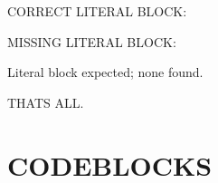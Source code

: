 \documentclass[letterpaper,10pt,english]{sphinxmanual}
\begin{document}
\sphinxAtStartPar
CORRECT LITERAL BLOCK:

\begin{sphinxVerbatim}[commandchars=\\\{\}]
 
 
\end{sphinxVerbatim}

\sphinxAtStartPar
MISSING LITERAL BLOCK:

\sphinxAtStartPar
Literal block expected; none found.


\sphinxAtStartPar
THAT\textquotesingle{}S ALL.
\def\sphinxLiteralBlockLabel{\label{\detokenize{literalblock:id1}}}
\begin{sphinxVerbatim}[commandchars=\\\{\}]

  

    

\end{sphinxVerbatim}


\chapter{CODE\sphinxhyphen{}BLOCKS}
\label{\detokenize{literalblock:code-blocks}}
\begin{sphinxVerbatim}[commandchars=\\\{\}]
\end{sphinxVerbatim}
\end{document}
